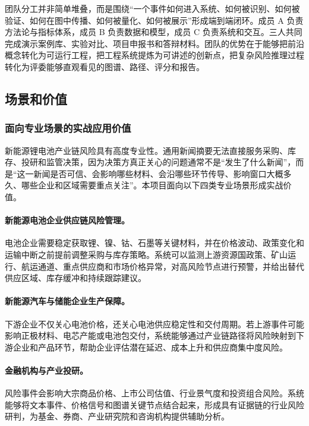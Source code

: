 ﻿\documentclass[12pt,a4paper]{article}
\begin{document}
团队分工并非简单堆叠，而是围绕“一个事件如何进入系统、如何被识别、如何被验证、如何在图中传播、如何被量化、如何被展示”形成端到端闭环。成员 A 负责方法论与指标体系，成员 B 负责数据和模型，成员 C 负责系统和交互。三人共同完成演示案例库、实验对比、项目申报书和答辩材料。团队的优势在于能够把前沿概念转化为可运行工程，把工程系统提炼为可讲述的创新点，把复杂风险推理过程转化为评委能够直观看见的图谱、路径、评分和报告。

\subsection{场景和价值}

\subsubsection{面向专业场景的实战应用价值}

新能源锂电池产业链风险具有高度专业性。通用新闻摘要无法直接服务采购、库存、投研和监管决策，因为决策方真正关心的问题通常不是“发生了什么新闻”，而是“这一新闻是否可信、会影响哪些材料、会沿哪些环节传导、影响窗口大概多久、哪些企业和区域需要重点关注”。本项目面向以下四类专业场景形成实战价值。

\paragraph{新能源电池企业供应链风险管理。}电池企业需要稳定获取锂、镍、钴、石墨等关键材料，并在价格波动、政策变化和运输中断之前提前调整采购与库存策略。系统可以监测上游资源国政策、矿山运行、航运通道、重点供应商和市场价格异常，对高风险节点进行预警，并给出替代供应区域、库存缓冲和持续跟踪建议。

\paragraph{新能源汽车与储能企业生产保障。}下游企业不仅关心电池价格，还关心电池供应稳定性和交付周期。若上游事件可能影响正极材料、电芯产能或电池包交付，系统能够通过产业链路径将风险映射到下游企业和产品环节，帮助企业评估潜在延迟、成本上升和供应商集中度风险。

\paragraph{金融机构与产业投研。}风险事件会影响大宗商品价格、上市公司估值、行业景气度和投资组合风险。系统能够将文本事件、价格信号和图谱关键节点结合起来，形成具有证据链的行业风险研判，为基金、券商、产业研究院和咨询机构提供辅助分析。
\end{document}
